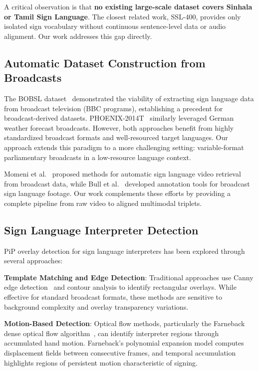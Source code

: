 \documentclass[journal]{IEEEtran}
\begin{document}
A critical observation is that \textbf{no existing large-scale dataset covers Sinhala or Tamil Sign Language}. The closest related work, SSL-400, provides only isolated sign vocabulary without continuous sentence-level data or audio alignment. Our work addresses this gap directly.

\subsection{Automatic Dataset Construction from Broadcasts}

The BOBSL dataset~\cite{albanie2021bobsl} demonstrated the viability of extracting sign language data from broadcast television (BBC programs), establishing a precedent for broadcast-derived datasets. PHOENIX-2014T~\cite{camgoz2018neural} similarly leveraged German weather forecast broadcasts. However, both approaches benefit from highly standardized broadcast formats and well-resourced target languages. Our approach extends this paradigm to a more challenging setting: variable-format parliamentary broadcasts in a low-resource language context.

Momeni et al.~\cite{momeni2020watch} proposed methods for automatic sign language video retrieval from broadcast data, while Bull et al.~\cite{bull2021aligning} developed annotation tools for broadcast sign language footage. Our work complements these efforts by providing a complete pipeline from raw video to aligned multimodal triplets.

\subsection{Sign Language Interpreter Detection}

PiP overlay detection for sign language interpreters has been explored through several approaches:

\textbf{Template Matching and Edge Detection}: Traditional approaches use Canny edge detection~\cite{canny1986computational} and contour analysis to identify rectangular overlays. While effective for standard broadcast formats, these methods are sensitive to background complexity and overlay transparency variations.

\textbf{Motion-Based Detection}: Optical flow methods, particularly the Farneback dense optical flow algorithm~\cite{farneback2003two}, can identify interpreter regions through accumulated hand motion. Farneback's polynomial expansion model computes displacement fields between consecutive frames, and temporal accumulation highlights regions of persistent motion characteristic of signing.
\end{document}
